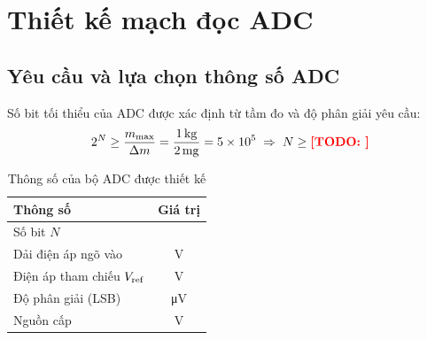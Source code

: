 \chapter{Thiết kế mạch đọc ADC}
\label{chap:c5}

\section{Yêu cầu và lựa chọn thông số ADC}
\label{sec:c5:thong-so}

Số bit tối thiểu của ADC được xác định từ tầm đo và độ phân giải yêu cầu:
\begin{equation}
    2^{N} \geq \frac{m_{\max}}{\Delta m} = \frac{\qty{1}{\kilo\gram}}{\qty{2}{\milli\gram}} = 5 \times 10^{5}
    \;\Rightarrow\; N \geq \textcolor{red}{\textbf{[TODO: ]}}
    \label{eq:c5:so-bit}
\end{equation}


\begin{table}[H]
    \centering
    \caption{Thông số của bộ ADC được thiết kế}
    \label{tab:c5:thong-so-adc}
    \renewcommand{\arraystretch}{1.3}
    \begin{tabular}{|l|c|}
        \hline
        \textbf{Thông số} & \textbf{Giá trị} \\ \hline
        Số bit $N$                   & \TODO{} \\ \hline
        Dải điện áp ngõ vào          & \TODO{} \unit{\volt} \\ \hline
        Điện áp tham chiếu $V_{\mathrm{ref}}$   & \TODO{} \unit{\volt} \\ \hline
        Độ phân giải (LSB)           & \TODO{} \unit{\micro\volt} \\ \hline
        Nguồn cấp                    & \TODO{} \unit{\volt} \\ \hline
    \end{tabular}
\end{table}

